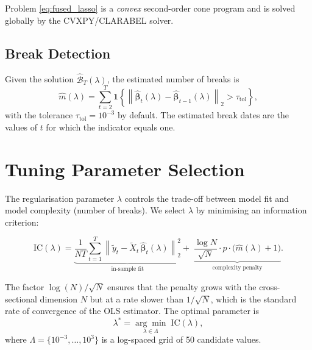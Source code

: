 \documentclass[12pt, a4paper]{article}
\theoremstyle{plain}
\theoremstyle{definition}
\theoremstyle{remark}
\newcommand{\bB}{\mathcal{B}}
\newcommand{\bbeta}{\bm{\beta}}
\newcommand{\norm}[1]{\left\| #1 \right\|}
\begin{document}
\begin{onehalfspacing}
Problem \eqref{eq:fused_lasso} is a \emph{convex} second-order cone program
and is solved globally by the CVXPY/CLARABEL solver.

\subsection{Break Detection}
\label{sub:detection}

Given the solution $\hat{\bB}_T(\lambda)$, the estimated number of breaks is
\begin{equation}
  \label{eq:mhat}
  \hat{m}(\lambda) = \sum_{t=2}^T
    \mathbf{1}\!\left\{
      \norm{\hat{\bbeta}_t(\lambda) - \hat{\bbeta}_{t-1}(\lambda)}_2
      > \tau_{\text{tol}}
    \right\},
\end{equation}
with the tolerance $\tau_{\text{tol}} = 10^{-3}$ by default.  The estimated
break dates are the values of $t$ for which the indicator equals one.

\section{Tuning Parameter Selection}
\label{sec:tuning}

The regularisation parameter $\lambda$ controls the trade-off between model
fit and model complexity (number of breaks).  We select $\lambda$ by
minimising an information criterion:

\begin{equation}
  \label{eq:ic}
  \text{IC}(\lambda) =
    \underbrace{
      \frac{1}{NT}\sum_{t=1}^T
      \norm{\tilde{y}_t - \tilde{X}_t\,\hat{\bbeta}_t(\lambda)}_2^2
    }_{\text{in-sample fit}}
    + \;
    \underbrace{
      \frac{\log N}{\sqrt{N}} \cdot p \cdot \bigl(\hat{m}(\lambda)+1\bigr)
    }_{\text{complexity penalty}}.
\end{equation}

The factor $\log(N)/\sqrt{N}$ ensures that the penalty grows with the
cross-sectional dimension $N$ but at a rate slower than $1/\sqrt{N}$, which
is the standard rate of convergence of the OLS estimator.  The optimal
parameter is
\begin{equation}
  \label{eq:lamstar}
  \lambda^* = \underset{\lambda \in \Lambda}{\arg\min}\; \text{IC}(\lambda),
\end{equation}
where $\Lambda = \{10^{-3}, \ldots, 10^{3}\}$ is a log-spaced grid of 50
candidate values.


\end{onehalfspacing}
\end{document}
